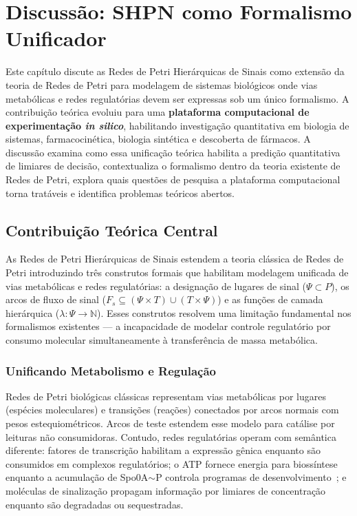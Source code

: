 \chapter{Discussão: SHPN como Formalismo Unificador}
\label{ch:discussao}

Este capítulo discute as Redes de Petri Hierárquicas de Sinais como extensão
da teoria de Redes de Petri para modelagem de sistemas biológicos onde vias
metabólicas e redes regulatórias devem ser expressas sob um único formalismo.
A contribuição teórica evoluiu para uma \textbf{plataforma computacional de
experimentação \textit{in silico}}, habilitando investigação quantitativa em
biologia de sistemas, farmacocinética, biologia sintética e descoberta de
fármacos.
A discussão examina como essa unificação teórica habilita a predição
quantitativa de limiares de decisão, contextualiza o formalismo dentro
da teoria existente de Redes de Petri, explora quais questões de pesquisa a
plataforma computacional torna tratáveis e identifica problemas teóricos
abertos.

\section{Contribuição Teórica Central}
\label{sec:contribuicao-central}

As Redes de Petri Hierárquicas de Sinais estendem a teoria clássica de Redes
de Petri introduzindo três construtos formais que habilitam modelagem unificada
de vias metabólicas e redes regulatórias: a designação de lugares de sinal
($\Psi \subset P$), os arcos de fluxo de sinal
($F_s \subseteq (\Psi \times T) \cup (T \times \Psi)$)
e as funções de camada hierárquica ($\lambda: \Psi \to \mathbb{N}$).
Esses construtos resolvem uma limitação fundamental nos formalismos existentes
— a incapacidade de modelar controle regulatório por consumo molecular
simultaneamente à transferência de massa metabólica.

\subsection{Unificando Metabolismo e Regulação}

Redes de Petri biológicas clássicas representam vias metabólicas por lugares
(espécies moleculares) e transições (reações) conectados por arcos normais com
pesos estequiométricos.
Arcos de teste estendem esse modelo para catálise por leituras não consumidoras.
Contudo, redes regulatórias operam com semântica diferente: fatores de
transcrição habilitam a expressão gênica enquanto são consumidos em complexos
regulatórios; o ATP fornece energia para biossíntese enquanto a acumulação de Spo0A${\sim}$P
controla programas de desenvolvimento~\cite{Fujita2005}; e moléculas de
sinalização propagam informação por limiares de concentração enquanto são
degradadas ou sequestradas.

